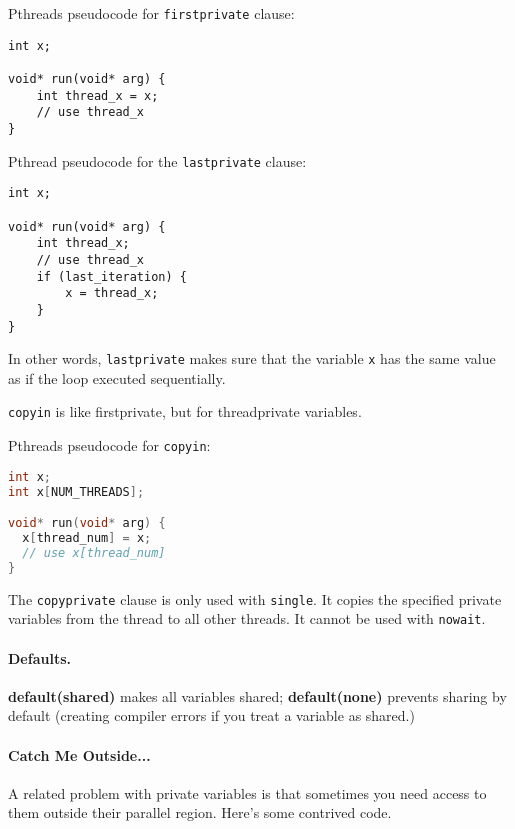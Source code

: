Pthreads pseudocode for {\tt firstprivate} clause:
  \begin{lstlisting}
int x;

void* run(void* arg) {
    int thread_x = x;
    // use thread_x
}
  \end{lstlisting}

Pthread pseudocode for the {\tt lastprivate} clause:
  \begin{lstlisting}
int x;

void* run(void* arg) {
    int thread_x;
    // use thread_x
    if (last_iteration) {
        x = thread_x;
    }
}
  \end{lstlisting}
In other words, {\tt lastprivate} makes sure that the variable {\tt x}
has the same value as if the loop executed sequentially.

{\tt copyin} is like firstprivate, but for threadprivate variables.

Pthreads pseudocode for {\tt copyin}:
  \begin{lstlisting}[language=C]
int x;
int x[NUM_THREADS];

void* run(void* arg) {
  x[thread_num] = x;
  // use x[thread_num]
}
  \end{lstlisting}

The {\tt copyprivate} clause is only used with {\tt single}.
It copies the specified private variables from the thread to all other
threads. It cannot be used with {\tt nowait}.

\paragraph{Defaults.} {\bf default(shared)} makes all variables shared; 
{\bf default(none)} prevents sharing by default (creating compiler errors if
you treat a variable as shared.)



\paragraph{Catch Me Outside...}
A related problem with private variables is that sometimes you need 
access to them outside their parallel region. Here's some contrived code.

